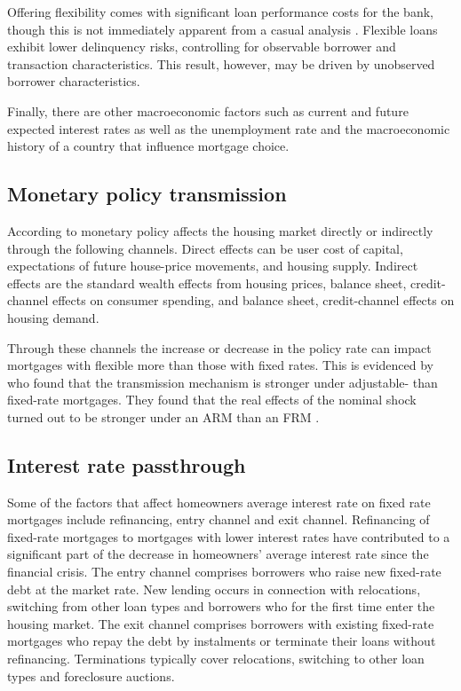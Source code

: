 \documentclass[
  letterpaper,
  DIV=11,
  numbers=noendperiod]{scrartcl}
\begin{document}
Offering flexibility comes with significant loan performance costs for
the bank, though this is not immediately apparent from a casual analysis
\citep{cocco2013evidence}. Flexible loans exhibit lower delinquency
risks, controlling for observable borrower and transaction
characteristics. This result, however, may be driven by unobserved
borrower characteristics.

Finally, there are other macroeconomic factors such as current and
future expected interest rates as well as the unemployment rate and the
macroeconomic history of a country that influence mortgage choice.

\subsection{Monetary policy
transmission}\label{monetary-policy-transmission}

According to \citet{mishkin2007housing} monetary policy affects the
housing market directly or indirectly through the following channels.
Direct effects can be user cost of capital, expectations of future
house-price movements, and housing supply. Indirect effects are the
standard wealth effects from housing prices, balance sheet,
credit-channel effects on consumer spending, and balance sheet,
credit-channel effects on housing demand.

Through these channels the increase or decrease in the policy rate can
impact mortgages with flexible more than those with fixed rates. This is
evidenced by \citet{garriga2017mortgages} who found that the
transmission mechanism is stronger under adjustable- than fixed-rate
mortgages. They found that the real effects of the nominal shock turned
out to be stronger under an ARM than an FRM
\citep{garriga2017mortgages}.

\subsection{Interest rate passthrough}\label{interest-rate-passthrough}

Some of the factors that affect homeowners average interest rate on
fixed rate mortgages include refinancing, entry channel and exit
channel. Refinancing of fixed-rate mortgages to mortgages with lower
interest rates have contributed to a significant part of the decrease in
homeowners' average interest rate since the financial crisis. The entry
channel comprises borrowers who raise new fixed-rate debt at the market
rate. New lending occurs in connection with relocations, switching from
other loan types and borrowers who for the first time enter the housing
market. The exit channel comprises borrowers with existing fixed-rate
mortgages who repay the debt by instalments or terminate their loans
without refinancing. Terminations typically cover relocations, switching
to other loan types and foreclosure auctions.
\end{document}
